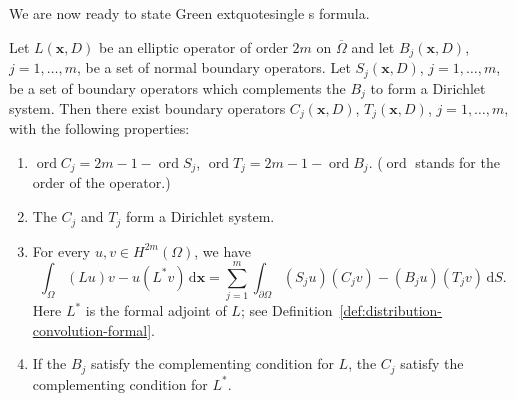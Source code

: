 We are now ready to state Green	extquotesingle s formula.

\begin{Theorem}
\label{thm:elliptic-green-formula-adjoint-boundary-operators}
Let $L(\bm{x},D)$ be an elliptic operator of order $2m$ on $\overline\Omega$ and let $B_j(\bm{x},D)$, $j=1,\ldots,m$, be a set of normal boundary operators. Let $S_j(\bm{x},D)$, $j=1,\ldots,m$, be a set of boundary operators which complements the $B_j$ to form a Dirichlet system. Then there exist boundary operators $C_j(\bm{x},D)$, $T_j(\bm{x},D)$, $j=1,\ldots,m$, with the following properties:\begin{enumerate}\item $\operatorname{ord}C_j=2m-1-\operatorname{ord}S_j$, $\operatorname{ord}T_j=2m-1-\operatorname{ord}B_j$. ($\operatorname{ord}$ stands for the order of the operator.)\item The $C_j$ and $T_j$ form a Dirichlet system.\item For every $u,v\in H^{2m}(\Omega)$, we have
\begin{equation}\label{eq:elliptic-green-formula-adjoint-boundary-pairing}
\int_\Omega(Lu)v-u(L^*v)\,\mathrm{d}\bm{x}=\sum_{j=1}^m\int_{\partial\Omega}(S_ju)(C_jv)-(B_ju)(T_jv)\,\mathrm{d}S.
\end{equation}
Here $L^*$ is the formal adjoint of $L$; see Definition~\ref{def:distribution-convolution-formal}.\item If the $B_j$ satisfy the complementing condition for $L$, the $C_j$ satisfy the complementing condition for $L^*$.\end{enumerate}
\end{Theorem}

